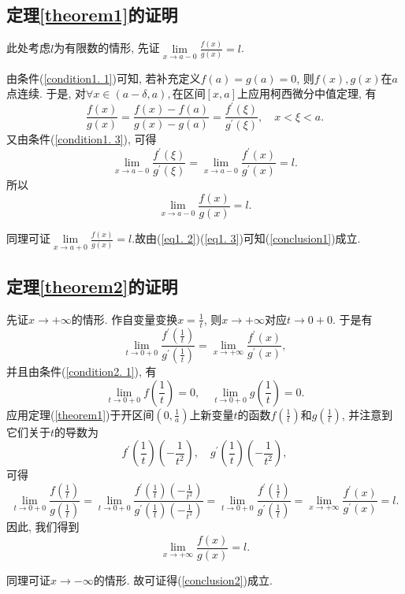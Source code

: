\documentclass{ctexart}
\begin{document}
\subsection{定理\ref{theorem1}的证明}
此处考虑$l$为有限数的情形, 先证$\lim\limits_{x\rightarrow a-0}\frac{f(x)}{g(x)}=l$.
\par 由条件(\ref{condition1. 1})可知, 若补充定义$f(a)=g(a)=0$, 则$f(x), g(x)$在$a$点连续. 于是, 对$\forall x\in(a-\delta, a), $在区间$[x, a]$上应用柯西微分中值定理, 有
\begin{equation}\label{eq1. 1}
    \frac{f(x)}{g(x)}=\frac{f(x)-f(a)}{g(x)-g(a)}=\frac{f^{'}(\xi)}{g^{'}(\xi)}, \quad x<\xi<a.
\end{equation}
又由条件(\ref{condition1. 3}), 可得
\begin{equation}\label{eq1. 2}
    \lim\limits_{x\rightarrow a-0}\frac{f^{'}(\xi)}{g^{'}(\xi)}=\lim\limits_{x\rightarrow a-0}\frac{f^{'}(x)}{g^{'}(x)}=l.
\end{equation}
所以
\begin{equation}\label{eq1. 3}
    \lim\limits_{x\rightarrow a-0}\frac{f(x)}{g(x)}=l. 
\end{equation}
\par 同理可证$\lim\limits_{x\rightarrow a+0}\frac{f(x)}{g(x)}=l. $故由(\ref{eq1. 2})(\ref{eq1. 3})可知(\ref{conclusion1})成立.
\subsection{定理\ref{theorem2}的证明}
先证$x\rightarrow +\infty$的情形. 作自变量变换$x=\frac{1}{t}$, 则$x\rightarrow +\infty$对应$t\rightarrow 0+0$. 于是有
\begin{equation}\label{eq2. 1}
    \lim_{t\rightarrow 0+0}\frac{f^{'}(\frac{1}{t})}{g^{'}(\frac{1}{t})}=\lim_{x\rightarrow +\infty}\frac{f^{'}(x)}{g^{'}(x)}, 
\end{equation}
并且由条件(\ref{condition2. 1}), 有
\begin{equation}\label{eq2. 2}
    \lim_{t\rightarrow 0+0}f(\frac{1}{t})=0, \quad\lim_{t\rightarrow 0+0}g(\frac{1}{t})=0.
\end{equation}
应用定理(\ref{theorem1})于开区间$(0, \frac{1}{a})$上新变量$t$的函数$f(\frac{1}{t})$和$g(\frac{1}{t})$, 并注意到它们关于$t$的导数为
\begin{equation}\label{eq2. 3}
    f^{'}(\frac{1}{t})(-\frac{1}{t^2}), \quad g^{'}(\frac{1}{t})(-\frac{1}{t^2}), 
\end{equation}
可得
\begin{equation}\label{eq2. 4}
    \lim_{t\rightarrow 0+0}\frac{f(\frac{1}{t})}{g(\frac{1}{t})}=\lim_{t\rightarrow 0+0}\frac{f^{'}(\frac{1}{t})(-\frac{1}{t^2})}{g^{'}(\frac{1}{t})(-\frac{1}{t^2})}=\lim_{t\rightarrow 0+0}\frac{f^{'}(\frac{1}{t})}{g^{'}(\frac{1}{t})}=\lim_{x\rightarrow +\infty}\frac{f^{'}(x)}{g^{'}(x)}=l.
\end{equation}
因此, 我们得到
\begin{equation}\label{eq2. 5}
    \lim_{x\rightarrow +\infty}\frac{f(x)}{g(x)}=l.
\end{equation}
\par 同理可证$x\rightarrow -\infty$的情形. 故可证得(\ref{conclusion2})成立.
\end{document}
